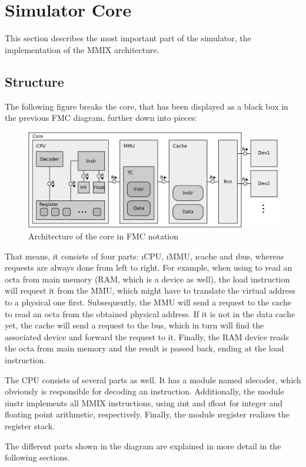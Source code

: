 \section{Simulator Core}

This section describes the most important part of the simulator, \ie the implementation of the MMIX architecture.

\subsection{Structure}

The following figure breaks the core, that has been displayed as a black box in the previous \gls{FMC} diagram, further down into pieces:
\begin{figure}[H]
	\centering
	\includegraphics[width=\textwidth]{img/sim-core-fmc-crop.pdf}
	\caption{Architecture of the core in \protect\gls{FMC} notation}
\end{figure}
\noindent That means, it consists of four parts: \i{CPU}, \i{MMU}, \i{cache} and \i{bus}, whereas requests are always done from left to right. For example, when using  to read an octa from main memory (RAM, which is a device as well), the load instruction will request it from the MMU, which might have to translate the virtual address to a physical one first. Subsequently, the MMU will send a request to the cache to read an octa from the obtained physical address. If it is not in the data cache yet, the cache will send a request to the bus, which in turn will find the associated device and forward the request to it. Finally, the RAM device reads the octa from main memory and the result is passed back, ending at the load instruction.

The CPU consists of several parts as well. It has a module named \i{decoder}, which obviously is responsible for decoding an instruction. Additionally, the module \i{instr} implements all MMIX instructions, using \i{int} and \i{float} for integer and floating point arithmetic, respectively. Finally, the module \i{register} realizes the register stack.

The different parts shown in the diagram are explained in more detail in the following sections.





